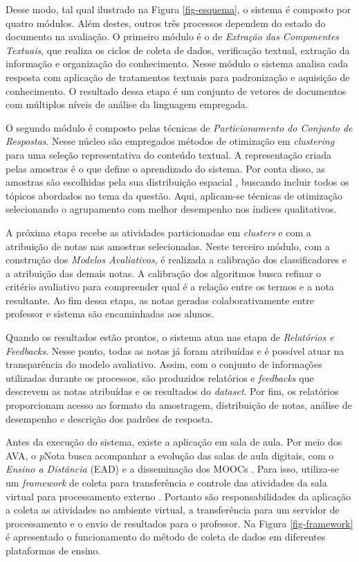 Desse modo, tal qual ilustrado na Figura \ref{fig-esquema}, o sistema é composto por quatro módulos. Além destes, outros três processos dependem do estado do documento na avaliação. O primeiro módulo é o de \textit{Extração das Componentes Textuais}, que realiza os ciclos de coleta de dados, verificação textual, extração da informação e organização do conhecimento. Nesse módulo o sistema analisa cada resposta com aplicação de tratamentos textuais para padronização e aquisição de conhecimento. O resultado dessa etapa é um conjunto de vetores de documentos com múltiplos níveis de análise da linguagem empregada.

O segundo módulo é composto pelas técnicas de \textit{Particionamento do Conjunto de Respostas}. Nesse núcleo são empregados métodos de otimização em \textit{clustering} para uma seleção representativa do conteúdo textual. A representação criada pelas amostras é o que define o aprendizado do sistema. Por conta disso, as amostras são escolhidas pela sua distribuição espacial \cite{salton1975, baeza2011}, buscando incluir todos os tópicos abordados no tema da questão. Aqui, aplicam-se técnicas de otimização selecionando o agrupamento com melhor desempenho nos índices qualitativos. 

A próxima etapa recebe as atividades particionadas em \textit{clusters} e com a atribuição de notas nas amostras selecionadas. Neste terceiro módulo, com a construção dos \textit{Modelos Avaliativos}, é realizada a calibração dos classificadores e a atribuição das demais notas. A calibração dos algoritmos busca refinar o critério avaliativo para compreender qual é a relação entre os termos e a nota resultante. Ao fim dessa etapa, as notas geradas colaborativamente entre professor e sistema são encaminhadas aos alunos.

Quando os resultados estão prontos, o sistema atua nas etapa de \textit{Relatórios e Feedbacks}. Nesse ponto, todas as notas já foram atribuídas e é possível atuar na transparência do modelo avaliativo. Assim, com o conjunto de informações utilizadas durante os processos, são produzidos relatórios e \textit{feedbacks} que descrevem as notas atribuídas e os resultados do \textit{dataset}. Por fim, os relatórios proporcionam acesso ao formato da amostragem, distribuição de notas, análise de desempenho e descrição dos padrões de resposta. 

Antes da execução do sistema, existe a aplicação em sala de aula. Por meio dos AVA, o \textit{p}Nota busca acompanhar a evolução das salas de aula digitais, com o \textit{Ensino a Distância} (EAD) e a disseminação dos MOOCs \cite{mohapatra2017}. Para isso, utiliza-se um \textit{framework} de coleta para transferência e controle das atividades da sala virtual para processamento externo \cite{spalenza2018}. Portanto são responsabilidades da aplicação a coleta as atividades no ambiente virtual, a transferência para um servidor de processamento e o envio de resultados para o professor. Na Figura \ref{fig-framework} é apresentado o funcionamento do método de coleta de dados em diferentes plataformas de ensino.

